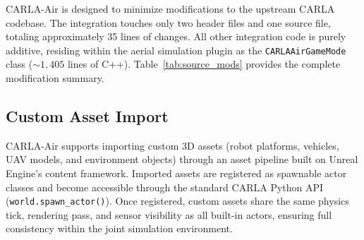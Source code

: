 CARLA-Air is designed to minimize modifications to the upstream CARLA codebase.
The integration touches only two header files and one source file, totaling
approximately 35 lines of changes.
All other integration code is purely additive, residing within the aerial
simulation plugin as the \texttt{CARLAAirGameMode} class
(${\sim}1{,}405$ lines of C++).
Table~\ref{tab:source_mods} provides the complete modification summary.



\begin{table}[!htbp]
\centering
\caption{Upstream CARLA source modifications.}
\label{tab:source_mods}
\small
\setlength{\tabcolsep}{3pt}
\renewcommand{\arraystretch}{1.08}
%
\end{table}

\subsection{Custom Asset Import}
\label{app:assets}

CARLA-Air supports importing custom 3D assets (robot platforms, vehicles, UAV
models, and environment objects) through an asset pipeline built on Unreal
Engine's content framework. Imported assets are registered as spawnable actor
classes and become accessible through the standard CARLA Python API
(\texttt{world.spawn\_actor()}). Once registered, custom assets share the same
physics tick, rendering pass, and sensor visibility as all built-in actors,
ensuring full consistency within the joint simulation environment. 
